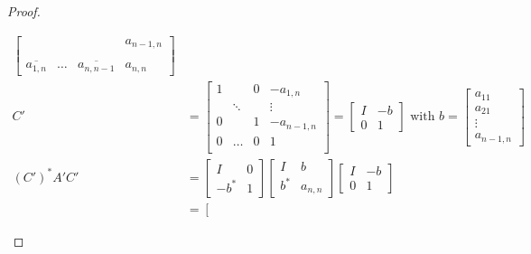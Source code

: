 \documentclass[a4paper]{article}
\numberwithin{lecref}{section}
\begin{document}
\begin{proof}
\begin{description}
\begin{description}
\begin{align*}
\begin{bmatrix}
                      & & & a_{n-1,n} \\ \\
                    \overline{a_{1,n}} & \ldots & \overline{a_{n,n-1}} & a_{n,n}
                  \end{bmatrix} \\
            C' &= \begin{bmatrix}
                    1 &        & 0 & -a_{1,n} \\
                      & \ddots &   & \vdots \\
                    0 &        & 1 & -a_{n-1,n} \\
                    0 & \dots  & 0 & 1 \\
                  \end{bmatrix}
                  = \left[
                    \begin{array}{c|c}
                      I & -b \\
                      \hline
                      0 & 1
                    \end{array}
                  \right]
                  \text{ with }
                  b = \begin{bmatrix} a_{11} \\ a_{21} \\ \vdots \\ a_{n-1,n} \end{bmatrix} \\
            (C')^* A'C' &= \left[
                    \begin{array}{c|c}
                      I & 0 \\
                      \hline
                      -b^* & 1
                    \end{array}
                  \right] \left[
                    \begin{array}{c|c}
                      I & b \\
                      \hline
                      b^* & a_{n,n}
                    \end{array}
                  \right] \left[
                    \begin{array}{c|c}
                      I & -b \\
                      \hline
                      0 & 1
                    \end{array}
                  \right] \\
              &= \left[
                    \begin{array}{c|c}

\end{array}
\end{align*}
\end{description}
\end{description}
\end{proof}
\end{document}
